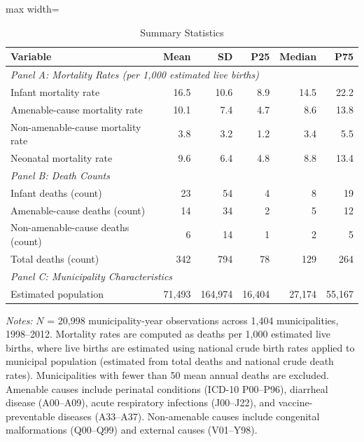 \begin{table}[H]
\centering
\caption{Summary Statistics}
\label{tab:summary}
\begin{threeparttable}
\begin{adjustbox}{max width=\textwidth}
\begin{tabular}{lrrrrr}
\toprule
Variable & Mean & SD & P25 & Median & P75 \\
\midrule
\multicolumn{6}{l}{\textit{Panel A: Mortality Rates (per 1,000 estimated live births)}} \\
Infant mortality rate & 16.5 & 10.6 & 8.9 & 14.5 & 22.2 \\
Amenable-cause mortality rate & 10.1 & 7.4 & 4.7 & 8.6 & 13.8 \\
Non-amenable-cause mortality rate & 3.8 & 3.2 & 1.2 & 3.4 & 5.5 \\
Neonatal mortality rate & 9.6 & 6.4 & 4.8 & 8.8 & 13.4 \\
\midrule
\multicolumn{6}{l}{\textit{Panel B: Death Counts}} \\
Infant deaths (count) & 23 & 54 & 4 & 8 & 19 \\
Amenable-cause deaths (count) & 14 & 34 & 2 & 5 & 12 \\
Non-amenable-cause deaths (count) & 6 & 14 & 1 & 2 & 5 \\
Total deaths (count) & 342 & 794 & 78 & 129 & 264 \\
\midrule
\multicolumn{6}{l}{\textit{Panel C: Municipality Characteristics}} \\
Estimated population & 71,493 & 164,974 & 16,404 & 27,174 & 55,167 \\
\bottomrule
\end{tabular}
\end{adjustbox}
\begin{tablenotes}[flushleft]
\small\raggedright
\item \textit{Notes:} $N$ = 20,998 municipality-year observations across 1,404 municipalities, 1998--2012. Mortality rates are computed as deaths per 1,000 estimated live births, where live births are estimated using national crude birth rates applied to municipal population (estimated from total deaths and national crude death rates). Municipalities with fewer than 50 mean annual deaths are excluded. Amenable causes include perinatal conditions (ICD-10 P00--P96), diarrheal disease (A00--A09), acute respiratory infections (J00--J22), and vaccine-preventable diseases (A33--A37). Non-amenable causes include congenital malformations (Q00--Q99) and external causes (V01--Y98).
\end{tablenotes}
\end{threeparttable}
\end{table}
